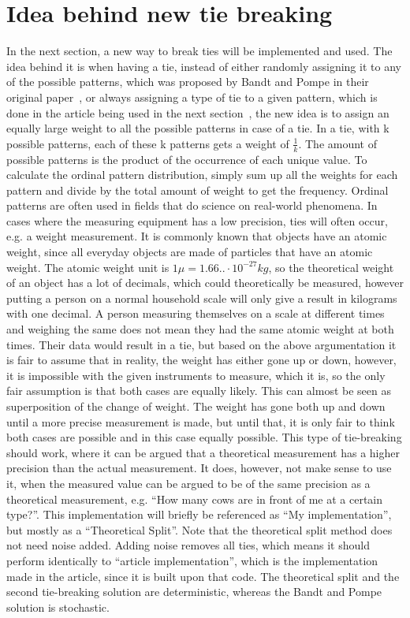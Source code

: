 \FloatBarrier

\section{Idea behind new tie breaking}
In the next section, a new way to break ties will be implemented and used. The idea behind it is when having a tie, instead of either randomly assigning it to any of the possible patterns, which was proposed by Bandt and Pompe in their original paper~\cite{Bandt2002}, or always assigning a type of tie to a given pattern, which is done in the article being used in the next section~\cite{Chagas2022}, the new idea is to assign an equally large weight to all the possible patterns in case of a tie. In a tie, with k possible patterns, each of these k patterns gets a weight of $\frac{1}{k}$. The amount of possible patterns is the product of the occurrence of each unique value. To calculate the ordinal pattern distribution, simply sum up all the weights for each pattern and divide by the total amount of weight to get the frequency. Ordinal patterns are often used in fields that do science on real-world phenomena. In cases where the measuring equipment has a low precision, ties will often occur, e.g. a weight measurement. It is commonly known that objects have an atomic weight, since all everyday objects are made of particles that have an atomic weight. The atomic weight unit is $1\mu = 1.66..\cdot10^{-27}kg$, so the theoretical weight of an object has a lot of decimals, which could theoretically be measured, however putting a person on a normal household scale will only give a result in kilograms with one decimal. A person measuring themselves on a scale at different times and weighing the same does not mean they had the same atomic weight at both times. Their data would result in a tie, but based on the above argumentation it is fair to assume that in reality, the weight has either gone up or down, however, it is impossible with the given instruments to measure, which it is, so the only fair assumption is that both cases are equally likely. This can almost be seen as superposition\cite{Schroedinger1926} of the change of weight. The weight has gone both up and down until a more precise measurement is made, but until that, it is only fair to think both cases are possible and in this case equally possible. This type of tie-breaking should work, where it can be argued that a theoretical measurement has a higher precision than the actual measurement. It does, however, not make sense to use it, when the measured value can be argued to be of the same precision as a theoretical measurement, e.g. “How many cows are in front of me at a certain type?”. This implementation will briefly be referenced as “My implementation”, but mostly as a “Theoretical Split”. Note that the theoretical split method does not need noise added. Adding noise removes all ties, which means it should perform identically to “article implementation”, which is the implementation made in the article\cite{Chagas2022}, since it is built upon that code. The theoretical split and the second tie-breaking solution are deterministic, whereas the Bandt and Pompe solution is stochastic.

